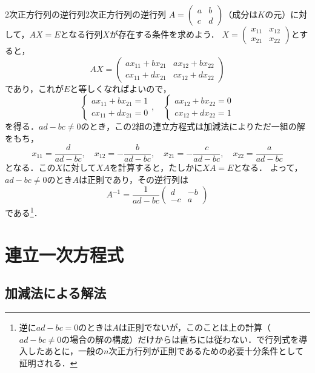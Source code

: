 \begin{example}{2次正方行列の逆行列}{2次正方行列の逆行列}
  $A = \begin{pmatrix} a & b \\ c & d \end{pmatrix}$（成分は$K$の元）に対して，$AX = E$となる行列$X$が存在する条件を求めよう．
  $X = \begin{pmatrix} x_{11} & x_{12} \\ x_{21} & x_{22} \end{pmatrix}$とすると，
  \[
    AX =
    \begin{pmatrix}
      ax_{11} + bx_{21} & ax_{12} + bx_{22} \\
      cx_{11} + dx_{21} & cx_{12} + dx_{22}
    \end{pmatrix}
  \]
  であり，これが$E$と等しくなればよいので，
  \[
    \begin{cases}
      ax_{11} + bx_{21} = 1 \\
      cx_{11} + dx_{21} = 0
    \end{cases}, \quad
    \begin{cases}
      ax_{12} + bx_{22} = 0 \\
      cx_{12} + dx_{22} = 1
    \end{cases}
  \]
  を得る．$ad - bc \ne 0$のとき，この$2$組の連立方程式は加減法によりただ一組の解をもち，
  \[
    x_{11} = \frac{d}{ad - bc}, \quad
    x_{12} = -\frac{b}{ad - bc}, \quad
    x_{21} = -\frac{c}{ad - bc}, \quad
    x_{22} = \frac{a}{ad - bc}
  \]
  となる．この$X$に対して$XA$を計算すると，たしかに$XA = E$となる．
  よって，$ad - bc \ne 0$のとき$A$は正則であり，その逆行列は
  \[
    A^{-1} = \frac{1}{ad - bc} \begin{pmatrix} d & -b \\ -c & a \end{pmatrix}
  \]
  である\footnote{逆に$ad - bc = 0$のときは$A$は正則でないが，このことは上の計算（$ad - bc \ne 0$の場合の解の構成）だけからは直ちには従わない．で行列式を導入したあとに，一般の$n$次正方行列が正則であるための必要十分条件として証明される．}．
\end{example}

\section{連立一次方程式}

\subsection{加減法による解法}

